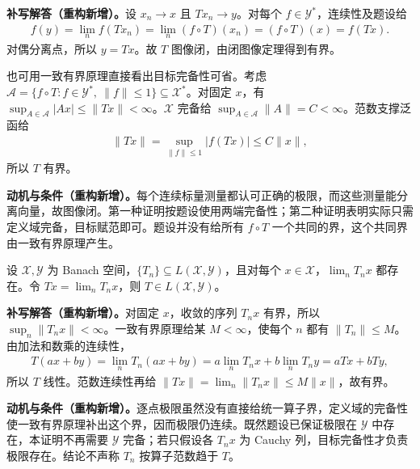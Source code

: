 \documentclass[../../main.tex]{subfiles}
\begin{document}
\begin{solution}
\textbf{补写解答（重构新增）。}设 $x_n\to x$ 且 $Tx_n\to y$。对每个 $f\in\mathcal Y^*$，连续性及题设给
\begin{align*}
f(y)=\lim_nf(Tx_n)=\lim_n(f\circ T)(x_n)=(f\circ T)(x)=f(Tx).
\end{align*}
对偶分离点，所以 $y=Tx$。故 $T$ 图像闭，由闭图像定理得到有界。

也可用一致有界原理直接看出目标完备性可省。考虑 $\mathcal A=\{f\circ T:f\in\mathcal Y^*,\ \|f\|\le1\}\subseteq\mathcal X^*$。对固定 $x$，有 $\sup_{A\in\mathcal A}|Ax|\le\|Tx\|<\infty$。$\mathcal X$ 完备给 $\sup_{A\in\mathcal A}\|A\|=C<\infty$。范数支撑泛函给
\begin{align*}
\|Tx\|=\sup_{\|f\|\le1}|f(Tx)|\le C\|x\|,
\end{align*}
所以 $T$ 有界。
\end{solution}
\begin{remark}
\textbf{动机与条件（重构新增）。}每个连续标量测量都认可正确的极限，而这些测量能分离向量，故图像闭。第一种证明按题设使用两端完备性；第二种证明表明实际只需定义域完备，目标赋范即可。题设并没有给所有 $f\circ T$ 一个共同的界，这个共同界由一致有界原理产生。
\end{remark}
\begin{exercise}\label{exercise:ch05-pointwise-operator-limit}
设 $\mathcal X,\mathcal Y$ 为 Banach 空间，$\{T_n\}\subseteq L(\mathcal X,\mathcal Y)$，且对每个 $x\in\mathcal X$，$\lim_nT_nx$ 都存在。令 $Tx=\lim_nT_nx$，则 $T\in L(\mathcal X,\mathcal Y)$。
\end{exercise}
\begin{solution}
\textbf{补写解答（重构新增）。}对固定 $x$，收敛的序列 $T_nx$ 有界，所以 $\sup_n\|T_nx\|<\infty$。一致有界原理给某 $M<\infty$，使每个 $n$ 都有 $\|T_n\|\le M$。由加法和数乘的连续性，
\begin{align*}
T(ax+by)=\lim_nT_n(ax+by)=a\lim_nT_nx+b\lim_nT_ny=aTx+bTy,
\end{align*}
所以 $T$ 线性。范数连续性再给 $\|Tx\|=\lim_n\|T_nx\|\le M\|x\|$，故有界。
\end{solution}
\begin{remark}
\textbf{动机与条件（重构新增）。}逐点极限虽然没有直接给统一算子界，定义域的完备性使一致有界原理补出这个界，因而极限仍连续。既然题设已保证极限在 $\mathcal Y$ 中存在，本证明不再需要 $\mathcal Y$ 完备；若只假设各 $T_nx$ 为 Cauchy 列，目标完备性才负责极限存在。结论不声称 $T_n$ 按算子范数趋于 $T$。
\end{remark}
\end{document}
